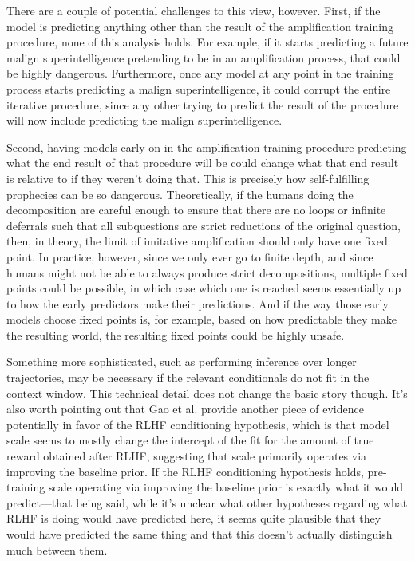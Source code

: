 {{There are a couple of potential challenges to this view, however. First, if the model is predicting anything other than the result of the amplification training procedure, none of this analysis holds. For example, if it starts predicting a future malign superintelligence pretending to be in an amplification process, that could be highly dangerous. Furthermore, once any model at any point in the training process starts predicting a malign superintelligence, it could corrupt the entire iterative procedure, since any other trying to predict the result of the procedure will now include predicting the malign superintelligence.

Second, having models early on in the amplification training procedure predicting what the end result of that procedure will be could change what that end result is relative to if they weren't doing that. This is precisely how self-fulfilling prophecies can be so dangerous. Theoretically, if the humans doing the decomposition are careful enough to ensure that there are no loops or infinite deferrals such that all subquestions are strict reductions of the original question, then, in theory, the limit of imitative amplification should only have one fixed point. In practice, however, since we only ever go to finite depth, and since humans might not be able to always produce strict decompositions, multiple fixed points could be possible, in which case which one is reached seems essentially up to how the early predictors make their predictions. And if the way those early models choose fixed points is, for example, based on how predictable they make the resulting world, the resulting fixed points could be highly unsafe.

     Something more sophisticated, such as performing inference over longer trajectories, may be necessary if the relevant conditionals do not fit in the context window. This technical detail does not change the basic story though.
     It's also worth pointing out that Gao et al. provide another piece of evidence potentially in favor of the RLHF conditioning hypothesis, which is that model scale seems to mostly change the intercept of the fit for the amount of true reward obtained after RLHF, suggesting that scale primarily operates via improving the baseline prior. If the RLHF conditioning hypothesis holds, pre-training scale operating via improving the baseline prior is exactly what it would predict---that being said, while it's unclear what other hypotheses regarding what RLHF is doing would have predicted here, it seems quite plausible that they would have predicted the same thing and that this doesn't actually distinguish much between them.


}}
